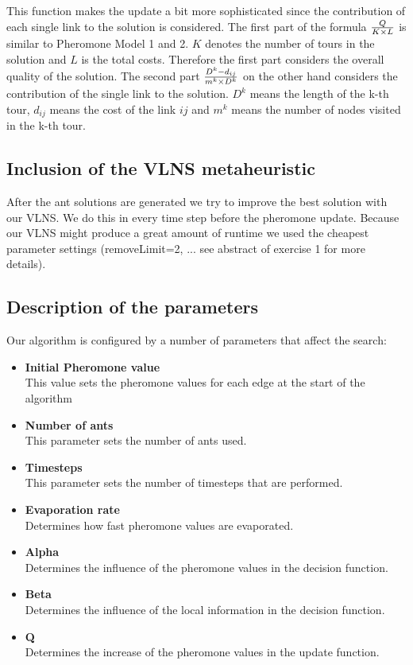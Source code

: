 \documentclass[a4paper]{scrartcl}
\begin{document}
This function makes the update a bit more sophisticated since the contribution of each single link to the solution is considered. The first part of the formula ${Q \over {K \times L}}$ is similar to Pheromone Model 1 and 2. $K$ denotes the number of tours in the solution and $L$ is the total costs. Therefore the first part considers the overall quality of the solution. The second part ${{D^k - d_{ij}} \over {m^k \times D^k}}$ on the other hand considers the contribution of the single link to the solution. $D^k$ means the length of the k-th tour, $d_{ij}$ means the cost of the link $ij$ and $m^k$ means the number of nodes visited in the k-th tour.


\subsection{Inclusion of the VLNS metaheuristic}

After the ant solutions are generated we try to improve the best solution with our VLNS. We do this in every time step before the pheromone update.
Because our VLNS might produce a great amount of runtime we used the cheapest parameter settings (removeLimit=2, ... see abstract of exercise 1 for more details).

\subsection{Description of the parameters}
Our algorithm is configured by a number of parameters that affect the search:

\begin{itemize}
  \item \textbf{Initial Pheromone value} \\
    This value sets the pheromone values for each edge at the start of the algorithm
  \item \textbf{Number of ants} \\
    This parameter sets the number of ants used.
  \item \textbf{Timesteps} \\
    This parameter sets the number of timesteps that are performed.
  \item \textbf{Evaporation rate} \\
    Determines how fast pheromone values are evaporated.
  \item \textbf{Alpha} \\
    Determines the influence of the pheromone values in the decision function.
  \item \textbf{Beta} \\
    Determines the influence of the local information in the decision function.
  \item \textbf{Q} \\
    Determines the increase of the pheromone values in the update function.
\end{itemize}
\end{document}
